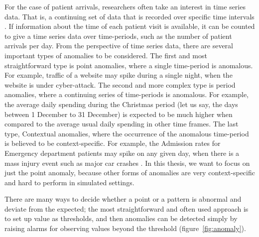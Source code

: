 For the case of patient arrivals, researchers often take an interest in time series data. That is, a continuing set of data that is recorded over specific time intervals \citep{das1994time}. If information about the time of each patient visit is available, it can be counted to give a time series data over time-periods, such as the number of patient arrivals per day. From the perspective of time series data, there are several important types of anomalies to be considered.  The first and most straightforward type is point anomalies, where a single time-period is anomalous. For example, traffic of a website may spike during a single night, when the website is under cyber-attack. The second and more complex type is period anomalies, where a continuing series of time-periods is anomalous. For example, the average daily spending during the Christmas period (let us say, the days between 1 December to 31 December) is expected to be much higher when compared to the average usual daily spending in other time frames. The last type, Contextual anomalies, where the occurrence of the anomalous time-period is believed to be context-specific. For example, the Admission rates for Emergency department patients may spike on any given day, when there is a mass injury event such as major car crashes \citep{chandola2009anomaly}. In this thesis, we want to focus on just the point anomaly, because other forms of anomalies are very context-specific and hard to perform in simulated settings. 

\newpara

There are many ways to decide whether a point or a pattern is abnormal and deviate from the expected; the most straightforward and often used approach is to set up value as thresholds, and then anomalies can be detected simply by raising alarms for observing values beyond the threshold (figure~\ref{fig:anomaly}).

